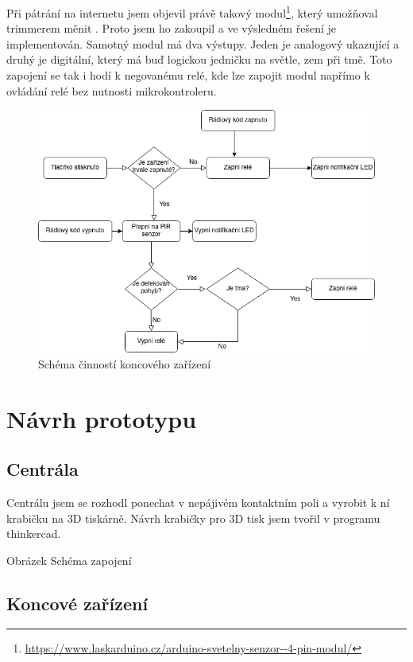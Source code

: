 \documentclass[11pt,a4paper,twoside,openright]{report}
\begin{document}
	
	Při pátrání na internetu jsem objevil právě takový modul\footnote{\url{https://www.laskarduino.cz/arduino-svetelny-senzor--4-pin-modul/}}, který umožňoval trimmerem měnit . Proto jsem ho zakoupil a ve výsledném řešení je implementován. Samotný modul má dva výstupy. Jeden je analogový ukazující  a druhý je digitální, který má buď logickou jedničku na světle, zem při tmě. Toto zapojení se tak i hodí k negovanému relé, kde lze zapojit modul napřímo k ovládání relé bez nutnosti mikrokontroleru.
	\begin{figure}[htb]
		\centering
		\includegraphics[width=1\hsize]{img/schema_koncove_zarizeni.png}
		\caption{Schéma činností koncového zařízení}\end{figure}
	
	\section{Návrh prototypu}
	\subsection{Centrála}
	
	Centrálu jsem se rozhodl ponechat v nepájivém kontaktním poli a vyrobit k ní krabičku na 3D tiskárně. Návrh krabičky pro 3D tisk jsem tvořil v programu thinkercad. 
	
	Obrázek Schéma zapojení
	
	\subsection{Koncové zařízení}
	
\end{document}
